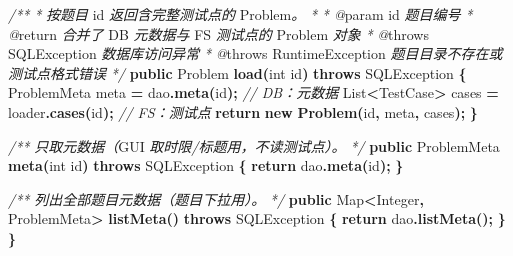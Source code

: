 \documentclass[
  11pt,
]{ctexart}
\newenvironment{Shaded}{\begin{snugshade}}{\end{snugshade}}
\newcommand{\BuiltInTok}[1]{#1}
\newcommand{\CommentTok}[1]{\textcolor[rgb]{0.56,0.35,0.01}{\textit{#1}}}
\newcommand{\ControlFlowTok}[1]{\textcolor[rgb]{0.13,0.29,0.53}{\textbf{#1}}}
\newcommand{\DataTypeTok}[1]{\textcolor[rgb]{0.13,0.29,0.53}{#1}}
\newcommand{\FunctionTok}[1]{\textcolor[rgb]{0.13,0.29,0.53}{\textbf{#1}}}
\newcommand{\KeywordTok}[1]{\textcolor[rgb]{0.13,0.29,0.53}{\textbf{#1}}}
\newcommand{\NormalTok}[1]{#1}
\newcommand{\OperatorTok}[1]{\textcolor[rgb]{0.81,0.36,0.00}{\textbf{#1}}}
\begin{document}
\begin{Shaded}
\begin{Highlighting}[]
    \CommentTok{/**}
     \CommentTok{*} \CommentTok{按题目}\NormalTok{ id }\CommentTok{返回含完整测试点的}\NormalTok{ Problem}\CommentTok{。}
     \CommentTok{*}
\CommentTok{     * @}\NormalTok{param id }\CommentTok{题目编号}
     \CommentTok{*} \CommentTok{@}\NormalTok{return }\CommentTok{合并了}\NormalTok{ DB }\CommentTok{元数据与}\NormalTok{ FS }\CommentTok{测试点的}\NormalTok{ Problem }\CommentTok{对象}
     \CommentTok{*} \CommentTok{@}\NormalTok{throws SQLException     }\CommentTok{数据库访问异常}
     \CommentTok{*} \CommentTok{@}\NormalTok{throws RuntimeException }\CommentTok{题目目录不存在或测试点格式错误}
     \CommentTok{*/}
    \KeywordTok{public}\NormalTok{ Problem }\FunctionTok{load}\OperatorTok{(}\DataTypeTok{int}\NormalTok{ id}\OperatorTok{)} \KeywordTok{throws} \BuiltInTok{SQLException} \OperatorTok{\{}
\NormalTok{        ProblemMeta meta }\OperatorTok{=}\NormalTok{ dao}\OperatorTok{.}\FunctionTok{meta}\OperatorTok{(}\NormalTok{id}\OperatorTok{);}             \CommentTok{// DB：元数据}
        \BuiltInTok{List}\OperatorTok{\textless{}}\NormalTok{TestCase}\OperatorTok{\textgreater{}}\NormalTok{ cases }\OperatorTok{=}\NormalTok{ loader}\OperatorTok{.}\FunctionTok{cases}\OperatorTok{(}\NormalTok{id}\OperatorTok{);}     \CommentTok{// FS：测试点}
        \ControlFlowTok{return} \KeywordTok{new} \FunctionTok{Problem}\OperatorTok{(}\NormalTok{id}\OperatorTok{,}\NormalTok{ meta}\OperatorTok{,}\NormalTok{ cases}\OperatorTok{);}
    \OperatorTok{\}}

    \CommentTok{/**} \CommentTok{只取元数据（}\NormalTok{GUI }\CommentTok{取时限/标题用，不读测试点）。} \CommentTok{*/}
    \KeywordTok{public}\NormalTok{ ProblemMeta }\FunctionTok{meta}\OperatorTok{(}\DataTypeTok{int}\NormalTok{ id}\OperatorTok{)} \KeywordTok{throws} \BuiltInTok{SQLException} \OperatorTok{\{}
        \ControlFlowTok{return}\NormalTok{ dao}\OperatorTok{.}\FunctionTok{meta}\OperatorTok{(}\NormalTok{id}\OperatorTok{);}
    \OperatorTok{\}}

    \CommentTok{/**} \CommentTok{列出全部题目元数据（题目下拉用）。} \CommentTok{*/}
    \KeywordTok{public} \BuiltInTok{Map}\OperatorTok{\textless{}}\BuiltInTok{Integer}\OperatorTok{,}\NormalTok{ ProblemMeta}\OperatorTok{\textgreater{}} \FunctionTok{listMeta}\OperatorTok{()} \KeywordTok{throws} \BuiltInTok{SQLException} \OperatorTok{\{}
        \ControlFlowTok{return}\NormalTok{ dao}\OperatorTok{.}\FunctionTok{listMeta}\OperatorTok{();}
    \OperatorTok{\}}
\OperatorTok{\}}
\end{Highlighting}
\end{Shaded}
\end{document}
